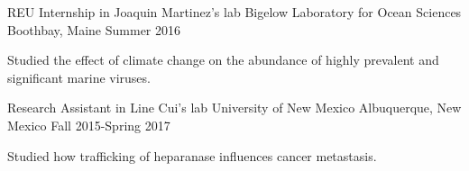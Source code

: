 \begin{cventries}
  \cventry
    {REU Internship in Joaquin Martinez's lab} %
    {Bigelow Laboratory for Ocean Sciences} %
    {Boothbay, Maine} %
    {Summer 2016} %
    {
      \begin{cvitems}
        \item{Studied the effect of climate change on the abundance of highly prevalent and significant marine viruses.}
      \end{cvitems}
    }

  \cventry
    {Research Assistant in Line Cui's lab} %
    {University of New Mexico} %
    {Albuquerque, New Mexico} %
    {Fall 2015-Spring 2017} %
    {
      \begin{cvitems}
        \item{Studied how trafficking of heparanase influences cancer metastasis.}
      \end{cvitems}
    }

\end{cventries}
